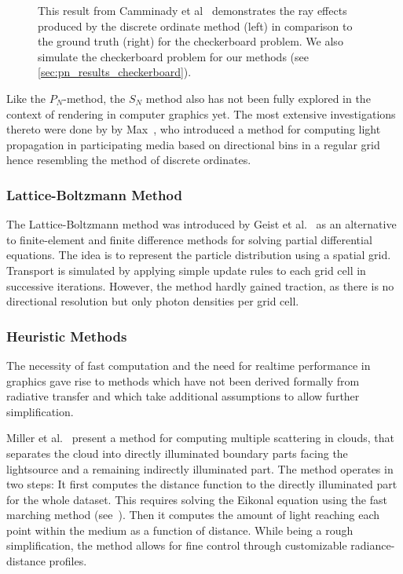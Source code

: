 \begin{figure}[h]
\begin{subfigure}{0.4\columnwidth}
\end{subfigure}%
\caption{This result from Camminady et al~\cite{Camminady2019} demonstrates the ray effects produced by the discrete ordinate method (left) in comparison to the ground truth (right) for the checkerboard problem. We also simulate the checkerboard problem for our methods (see \ref{sec:pn_results_checkerboard}).}
\end{figure}

Like the $P_N$-method, the $S_N$ method also has not been fully explored in the context of rendering in computer graphics yet. The most extensive investigations thereto were done by by Max~\cite{Max95}, who introduced a method for computing light propagation in participating media based on directional bins in a regular grid hence resembling the method of discrete ordinates.


\subsubsection*{Lattice-Boltzmann Method}

The Lattice-Boltzmann method was introduced by Geist et al.~\cite{Geist04} as an alternative to finite-element and finite difference methods for solving partial differential equations. The idea is to represent the particle distribution using a spatial grid. Transport is simulated by applying simple update rules to each grid cell in successive iterations. However, the method hardly gained traction, as there is no directional resolution but only photon densities per grid cell.

\subsubsection*{Heuristic Methods}

The necessity of fast computation and the need for realtime performance in graphics gave rise to methods which have not been derived formally from radiative transfer and which take additional assumptions to allow further simplification.

Miller et al.~\cite{Miller12} present a method for computing multiple scattering in clouds, that separates the cloud into directly illuminated boundary parts facing the lightsource and a remaining indirectly illuminated part. The method operates in two steps: It first computes the distance function to the directly illuminated part for the whole dataset. This requires solving the Eikonal equation using the fast marching method (see~\cite{Tsitsiklis95}). Then it computes the amount of light reaching each point within the medium as a function of distance. While being a rough simplification, the method allows for fine control through customizable radiance-distance profiles.

